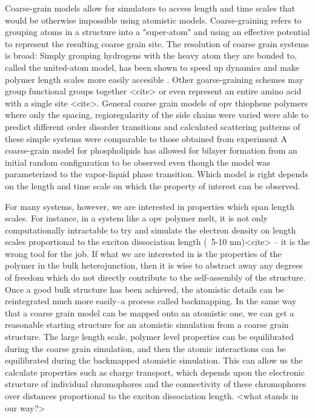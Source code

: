 Coarse-grain models allow for simulators to access length and time scales that would be otherwise impossible using atomistic models.
Coarse-graining refers to grouping atoms in a structure into a "super-atom" and using an effective potential to represent the resulting coarse grain site.
The resolution of coarse grain systems is broad:
Simply grouping hydrogens with the heavy atom they are bonded to, called the united-atom model, has been shown to speed up dynamics and make polymer length scales more easily accesible \cite{Paul1995a, Yang2006a,}.
Other goarse-graining schemes may group functional groups together <cite> or even represent an entire amino acid with a single site <cite>.
General coarse grain models of opv thiophene polymers where only the spacing, regioregularity of the side chains were varied were able to predict different order disorder transitions and calculated scattering patterns of these simple systems were comparable to those obtained from experiment \cite{Jankowski2013, Marsh2014} 
A coarse-grain model for phospholipids has allowed for bilayer formation from an initial random configuration to be observed even though the model was parameterized to the vapor-liquid phase transition.\cite{Shelley2001}
Which model is right depends on the length and time scale on which the property of interest can be observed.

For many systems, however, we are interested in properties which span length scales.
For instance, in a system like a opv polymer melt, it is not only computationally intractable to try and simulate the electron density on length scales proportional to the exciton dissociation length (~5-10 nm)<cite> -- it is the wrong tool for the job.
If what we are interested in is the properties of the polymer in the bulk heterojunction, then it is wise to abstract away any degrees of freedom which do not directly contribute to the self-assembly of the structure.
Once a good bulk structure has been achieved, the atomistic details can be reintegrated much more easily--a process called backmapping.
In the same way that a coarse grain model can be mapped onto an atomistic one, we can get a reasonable starting structure for an atomistic simulation from a coarse grain structure.
The large length scale, polymer level properties can be equilibrated during the coarse grain simulation, and then the atomic interactions can be equilibrated during the backmapped atomistic simulation.
This can allow us the calculate properties such as charge transport, which depends upon the electronic structure of individual chromophores and the connectivity of these chromophores over distances proportional to the exciton dissociation length.
<what stands in our way?>

